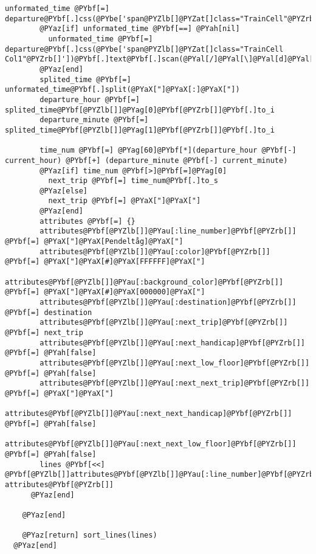 \begin{Verbatim}[commandchars=@\[\]]
        unformated_time @PYbf[=] departure@PYbf[.]css(@PYbe['span@PYZlb[]@PYZat[]class="TrainCell"@PYZrb[]'])@PYbf[.]text@PYbf[.]scan(@PYal[/]@PYal[\]@PYal[d]@PYal[\]@PYal[d*:]@PYal[\]@PYal[d]@PYal[\]@PYal[d]@PYal[/])@PYbf[@PYZlb[]]@PYag[0]@PYbf[@PYZrb[]]
        @PYaz[if] unformated_time @PYbf[==] @PYah[nil]
          unformated_time @PYbf[=] departure@PYbf[.]css(@PYbe['span@PYZlb[]@PYZat[]class="TrainCell Col1"@PYZrb[]'])@PYbf[.]text@PYbf[.]scan(@PYal[/]@PYal[\]@PYal[d]@PYal[\]@PYal[d*:]@PYal[\]@PYal[d]@PYal[\]@PYal[d]@PYal[/])@PYbf[@PYZlb[]]@PYag[0]@PYbf[@PYZrb[]]
        @PYaz[end]
        splited_time @PYbf[=] unformated_time@PYbf[.]split(@PYaX["]@PYaX[:]@PYaX["])
        departure_hour @PYbf[=] splited_time@PYbf[@PYZlb[]]@PYag[0]@PYbf[@PYZrb[]]@PYbf[.]to_i
        departure_minute @PYbf[=] splited_time@PYbf[@PYZlb[]]@PYag[1]@PYbf[@PYZrb[]]@PYbf[.]to_i
        
        time_num @PYbf[=] @PYag[60]@PYbf[*](departure_hour @PYbf[-] current_hour) @PYbf[+] (departure_minute @PYbf[-] current_minute)
        @PYaz[if] time_num @PYbf[>]@PYbf[=]@PYag[0]
          next_trip @PYbf[=] time_num@PYbf[.]to_s
        @PYaz[else]
          next_trip @PYbf[=] @PYaX["]@PYaX["]
        @PYaz[end]
        attributes @PYbf[=] {}
        attributes@PYbf[@PYZlb[]]@PYau[:line_number]@PYbf[@PYZrb[]]       @PYbf[=] @PYaX["]@PYaX[Pendeltåg]@PYaX["]
        attributes@PYbf[@PYZlb[]]@PYau[:color]@PYbf[@PYZrb[]]             @PYbf[=] @PYaX["]@PYaX[#]@PYaX[FFFFFF]@PYaX["]
        attributes@PYbf[@PYZlb[]]@PYau[:background_color]@PYbf[@PYZrb[]]  @PYbf[=] @PYaX["]@PYaX[#]@PYaX[000000]@PYaX["]
        attributes@PYbf[@PYZlb[]]@PYau[:destination]@PYbf[@PYZrb[]]       @PYbf[=] destination
        attributes@PYbf[@PYZlb[]]@PYau[:next_trip]@PYbf[@PYZrb[]]         @PYbf[=] next_trip
        attributes@PYbf[@PYZlb[]]@PYau[:next_handicap]@PYbf[@PYZrb[]]        @PYbf[=] @PYah[false]
        attributes@PYbf[@PYZlb[]]@PYau[:next_low_floor]@PYbf[@PYZrb[]]       @PYbf[=] @PYah[false]
        attributes@PYbf[@PYZlb[]]@PYau[:next_next_trip]@PYbf[@PYZrb[]]    @PYbf[=] @PYaX["]@PYaX["]
        attributes@PYbf[@PYZlb[]]@PYau[:next_next_handicap]@PYbf[@PYZrb[]]        @PYbf[=] @PYah[false]
        attributes@PYbf[@PYZlb[]]@PYau[:next_next_low_floor]@PYbf[@PYZrb[]]       @PYbf[=] @PYah[false]
        lines @PYbf[<<] @PYbf[@PYZlb[]]attributes@PYbf[@PYZlb[]]@PYau[:line_number]@PYbf[@PYZrb[]], attributes@PYbf[@PYZrb[]]
      @PYaz[end]
      
    @PYaz[end]
    
    @PYaz[return] sort_lines(lines)
  @PYaz[end]
  

\end{Verbatim}

